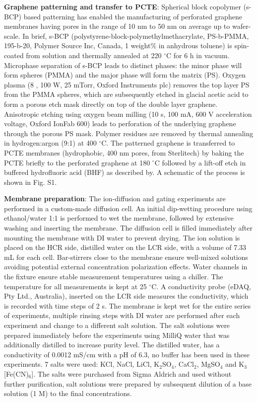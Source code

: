 \documentclass[journal=nalefd,email=true, hyperref=true, keywords=false]{achemso}
\newcommand{\Fig}{Fig.}
\begin{document}
\vspace{1em}
\noindent
\textbf{Graphene patterning and transfer to PCTE}: Spherical block
copolymer (s-BCP) based patterning has enabled the manufacturing of
perforated graphene membranes having pores in the range of 10 nm to 50
nm on average up to wafer-scale\cite{Choi_2018}. In brief, s-BCP
(polystyrene-block-polymethylmethacrylate, PS-b-PMMA, 195-b-20,
Polymer Source Inc, Canada, 1 weight\% in anhydrous toluene) is
spin-coated from solution and thermally annealed at 220 $^{\circ}$C
for 6 h in vacuum. Microphase separation of s-BCP leads to distinct
phases: the minor phase will form spheres (PMMA) and the major phase
will form the matrix (PS). Oxygen plasma (8 , 100 W, 25 mTorr, Oxford
Instruments plc) removes the top layer PS from the PMMA spheres, which
are subsequently etched in glacial acetic acid to form a porous
etch mask directly on top of the double layer graphene. Anisotropic
etching using oxygen beam milling (10 s, 100 mA, 600 V acceleration
voltage, Oxford IonFab 600) leads to perforation of the underlying
graphene through the porous PS mask. Polymer residues are removed by
thermal annealing in hydrogen:argon (9:1) at 400 $^{\circ}$C. The
patterned graphene is transferred to PCTE membranes (hydrophobic, 400
nm pores, from Sterlitech) by baking the PCTE briefly to the
perforated graphene at 180 $^{\circ}$C followed by a lift-off etch in
buffered hydrofluoric acid (BHF) as described by\cite{Choi_2018}. A
schematic of the process is shown in \Fig{} S1.

\vspace{1em}
\noindent
\textbf{Membrane preparation}: The ion-diffusion and gating experiments are
performed in a custom-made diffusion cell. An initial dip-wetting
procedure using ethanol/water 1:1 is performed to wet the membrane,
followed by extensive washing and inserting the membrane. The
diffusion cell is filled immediately after mounting the membrane with
DI water to prevent drying. The ion solution is placed on the HCR
side, distilled water on the LCR side, with a volume of 7.33 mL for
each cell. Bar-stirrers close to the membrane ensure well-mixed
solutions avoiding potential external concentration polarization
effects. Water channels in the fixture ensure stable measurement
temperatures using a chiller. The temperature for all measurements is
kept at 25 $^{\circ}$C. A conductivity probe (eDAQ, Pty Ltd.,
Australia), inserted on the LCR side measures the conductivity, which
is recorded with time steps of 2 s. The membrane is kept wet for the
entire series of experiments, multiple rinsing steps with DI water are
performed after each experiment and change to a different salt
solution. The salt solutions were prepared immediately before the
experiments using MilliQ water that was additionally distilled to
increase purity level. The distilled water, has a conductivity of
0.0012 mS/cm with a pH of 6.3, no buffer has been used in these
experiments. 7 salts were used: KCl, NaCl, LiCl, K$_{2}$SO$_{4}$,
CaCl$_{2}$, MgSO$_{4}$ and K$_{3}$[Fe(CN)$_{6}$]. The salts were
purchased from Sigma Aldrich and used without further purification,
salt solutions were prepared by subsequent dilution of a base solution
(1 M) to the final concentrations.
\end{document}
